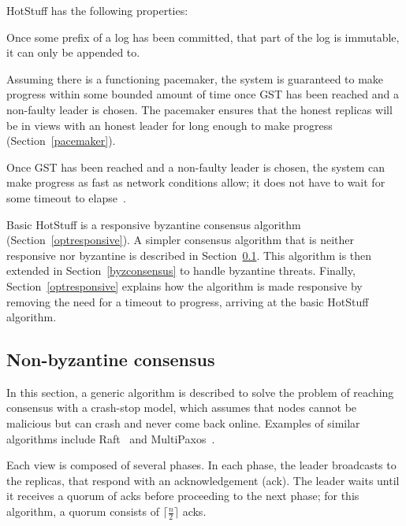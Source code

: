 HotStuff has the following properties:

\begin{property}[Safety] \label{safetyproperty}
	Once some prefix of a log has been committed, that part of the log is immutable, it can only be appended to.
\end{property}

\begin{property}[Liveness] \label{livenessproperty}
	Assuming there is a functioning pacemaker, the system is guaranteed to make progress within some bounded amount of time once GST has been reached and a non-faulty leader is chosen. The pacemaker ensures that the honest replicas will be in views with an honest leader for long enough to make progress (Section~\ref{pacemaker}).
\end{property}

\begin{property} \label{optresponsiveproperty}
	Once GST has been reached and a non-faulty leader is chosen, the system can make progress as fast as network conditions allow; it does not have to wait for some timeout to elapse~\cite{passThunderellaBlockchainsOptimistic2018}.
\end{property}

Basic HotStuff is a responsive byzantine consensus algorithm (Section~\ref{optresponsive}). A simpler consensus algorithm that is neither responsive nor byzantine is described in Section~\ref{nonbyzconsensus}. This algorithm is then extended in Section~\ref{byzconsensus} to handle byzantine threats. Finally, Section~\ref{optresponsive} explains how the algorithm is made responsive by removing the need for a timeout to progress, arriving at the basic HotStuff algorithm.

\subsection{Non-byzantine consensus} \label{nonbyzconsensus}
In this section, a generic algorithm is described to solve the problem of reaching consensus with a crash-stop model, which assumes that nodes cannot be malicious but can crash and never come back online. Examples of similar algorithms include Raft~\cite{ongaroSearchUnderstandableConsensus2014} and \mbox{MultiPaxos~\cite{lamportParttimeParliament1998, lamportPaxosMadeSimple2001}}.

Each view is composed of several phases. In each phase, the leader broadcasts to the replicas, that respond with an acknowledgement (ack). The leader waits until it receives a quorum of acks before proceeding to the next phase; for this algorithm, a quorum consists of $\lceil\frac{n}{2}\rceil$ acks.

